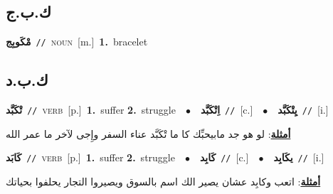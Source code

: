 \documentclass[10pt,a4paper,twoside]{article} %
\begin{document}
\begin{multicols}{2}
\vspace{-3mm}
\subsection*{\color{blue}\foreignlanguage{arabic}{ك.ب.ج}\color{blue}{}} 

{\setlength\topsep{0pt}\textbf{\foreignlanguage{arabic}{مْكَوبِج}}\ {\color{gray}\texttt{//}\color{black}}\ \textsc{noun}\ [m.]\ \textbf{1.}~bracelet\ } \vspace{2mm}

\vspace{-3mm}
\subsection*{\color{blue}\foreignlanguage{arabic}{ك.ب.د}\color{blue}{}} 

{\setlength\topsep{0pt}\textbf{\foreignlanguage{arabic}{تْكَبَّد}}\ {\color{gray}\texttt{//}\color{black}}\ \textsc{verb}\ [p.]\ \textbf{1.}~suffer  \textbf{2.}~struggle\ \ $\bullet$\ \ \setlength\topsep{0pt}\textbf{\foreignlanguage{arabic}{اِتْكَبَّد}}\ {\color{gray}\texttt{//}\color{black}}\ [c.]\ \ $\bullet$\ \ \setlength\topsep{0pt}\textbf{\foreignlanguage{arabic}{يِتْكَبَّد}}\ {\color{gray}\texttt{//}\color{black}}\ [i.]\  \begin{flushright}\color{gray}\foreignlanguage{arabic}{\textbf{\underline{\foreignlanguage{arabic}{أمثلة}}}: لو هو جد مابيحبِّك كا ما تْكَبَّد عناء السفر وإِجى لآخر ما عمر الله}\end{flushright}\color{black}} \vspace{2mm}

{\setlength\topsep{0pt}\textbf{\foreignlanguage{arabic}{كَابَد}}\ {\color{gray}\texttt{//}\color{black}}\ \textsc{verb}\ [p.]\ \textbf{1.}~suffer  \textbf{2.}~struggle\ \ $\bullet$\ \ \setlength\topsep{0pt}\textbf{\foreignlanguage{arabic}{كَابِد}}\ {\color{gray}\texttt{//}\color{black}}\ [c.]\ \ $\bullet$\ \ \setlength\topsep{0pt}\textbf{\foreignlanguage{arabic}{يكَابِد}}\ {\color{gray}\texttt{//}\color{black}}\ [i.]\  \begin{flushright}\color{gray}\foreignlanguage{arabic}{\textbf{\underline{\foreignlanguage{arabic}{أمثلة}}}: اتعب وكابِد عشان يصير الك اسم بالسوق ويصيروا التجار يحلفوا بحياتك}\end{flushright}\color{black}} \vspace{2mm}


\end{multicols}
\end{document}
